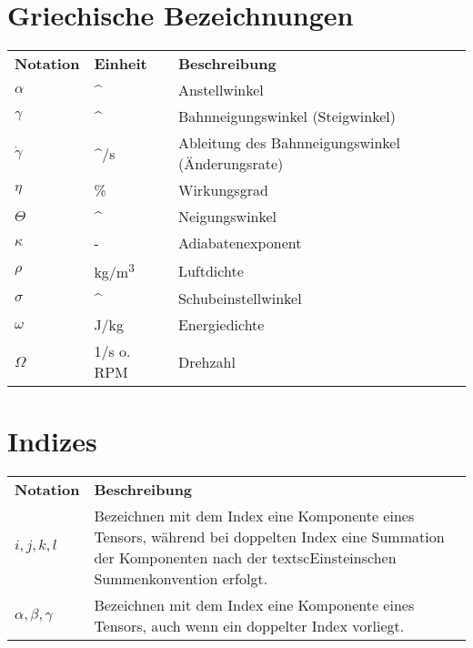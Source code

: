 \section*{Griechische Bezeichnungen}
\begin{longtable}{lp{2.5cm}p{10.5cm}}
	\textbf{Notation} & \textbf{Einheit} & \textbf{Beschreibung}\\
	\ensuremath{\alpha}	& \si{^\circ}		& Anstellwinkel \\
	\ensuremath{\gamma}	& \si{^\circ}		& Bahnneigungswinkel (Steigwinkel)\\
	\ensuremath{\dot{\gamma}}& \si{^\circ /s}& Ableitung des Bahnneigungswinkel (Änderungsrate) \\
	\ensuremath{\eta}	& \si{\%}			& Wirkungsgrad \\
	\ensuremath{\Theta} & \si{^\circ}		& Neigungswinkel \\
	\ensuremath{\kappa}	& -					& Adiabatenexponent \\
	\ensuremath{\rho}	& \si{kg/m^3}		& Luftdichte \\
	\ensuremath{\sigma}	& \si{^\circ}		& Schubeinstellwinkel\\
	\ensuremath{\omega}	& \si{J/kg}			& Energiedichte \\
	\ensuremath{\Omega}	& \si{1/s} o. \si{RPM}	& Drehzahl
	
		
	
	
\end{longtable}
%
\section*{Indizes}
\begin{longtable}{lp{13cm}}
	\textbf{Notation} & \textbf{Beschreibung}\\
	$i, j, k, l$ & Bezeichnen mit dem Index eine Komponente eines Tensors,
		während bei doppelten Index eine Summation der Komponenten nach
		der textsc{Einstein}schen Summenkonvention erfolgt.\\
    $\alpha , \beta , \gamma$ & Bezeichnen mit dem Index eine Komponente eines
    	Tensors, auch wenn ein doppelter Index vorliegt.
\end{longtable}
%
